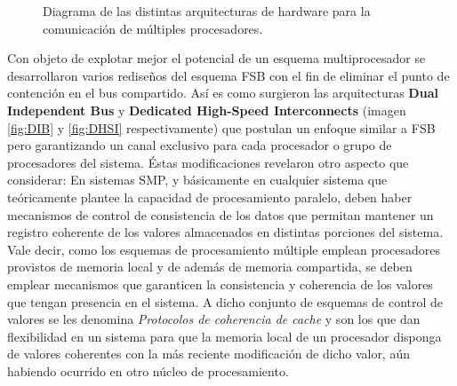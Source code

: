 \begin{figure}[th!]
\centering
{}
\caption{Diagrama de las distintas arquitecturas de hardware para la comunicación de múltiples procesadores.}
\label{fig:arquitecturas}
\end{figure}

Con objeto de explotar mejor el potencial de un esquema multiprocesador se desarrollaron varios rediseños del esquema FSB con el fin de eliminar el punto de contención en el bus compartido. Así es como surgieron las arquitecturas \textbf{Dual Independent Bus} y \textbf{Dedicated High-Speed Interconnects} (imagen \ref{fig:DIB} y \ref{fig:DHSI} respectivamente) que postulan un enfoque similar a FSB pero garantizando un canal exclusivo para cada procesador o grupo de procesadores del sistema. Éstas modificaciones revelaron otro aspecto que considerar: En sistemas SMP, y básicamente en cualquier sistema que teóricamente plantee la capacidad de procesamiento paralelo, deben haber mecanismos de control de consistencia de los datos que permitan mantener un registro coherente de los valores almacenados en distintas porciones del sistema. Vale decir, como los esquemas de procesamiento múltiple emplean procesadores provistos de memoria local y de además de memoria compartida, se deben emplear mecanismos que garanticen la consistencia y coherencia de los valores que tengan presencia en el sistema. A dicho conjunto de esquemas de control de valores se les denomina \emph{Protocolos de coherencia de cache} y son los que dan flexibilidad en un sistema para que la memoria local de un procesador disponga de valores coherentes con la más reciente modificación de dicho valor, aún habiendo ocurrido en otro núcleo de procesamiento.


